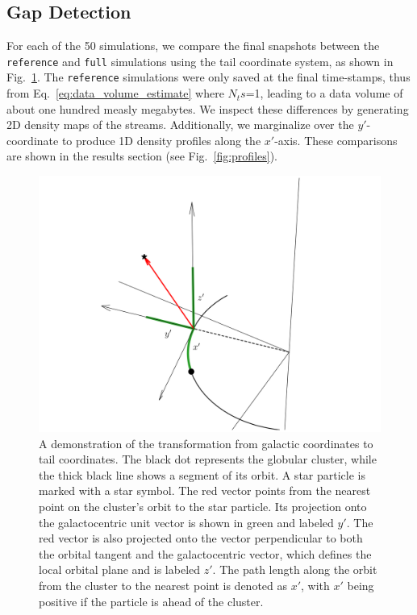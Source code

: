 \documentclass[draft]{aa}
\begin{document}
\begin{appendix}
  
  
  \section{Gap Detection} \label{sec:gap_detection}
    For each of the 50 simulations, we compare the final snapshots between the \texttt{reference} and \texttt{full} simulations using the tail coordinate system, as shown in Fig.~\ref{fig:TailCoordinates}. The \texttt{reference} simulations were only saved at the final time-stamps, thus from Eq.~\ref{eq:data_volume_estimate} where $N_ts$=1, leading to a data volume of about one hundred measly megabytes. We inspect these differences by generating 2D density maps of the streams. Additionally, we marginalize over the $y'$-coordinate to produce 1D density profiles along the $x'$-axis. These comparisons are shown in the results section (see Fig.~\ref{fig:profiles}).
    \begin{figure}
      \centering
      \includegraphics[width=\linewidth]{tailcoordinates.png}
      \caption{A demonstration of the transformation from galactic coordinates to tail coordinates. The black dot represents the globular cluster, while the thick black line shows a segment of its orbit. A star particle is marked with a star symbol. The red vector points from the nearest point on the cluster's orbit to the star particle. Its projection onto the galactocentric unit vector is shown in green and labeled $y'$. The red vector is also projected onto the vector perpendicular to both the orbital tangent and the galactocentric vector, which defines the local orbital plane and is labeled $z'$. The path length along the orbit from the cluster to the nearest point is denoted as $x'$, with $x'$ being positive if the particle is ahead of the cluster.}
      \label{fig:TailCoordinates}
    \end{figure}
  

\end{appendix}
\end{document}
